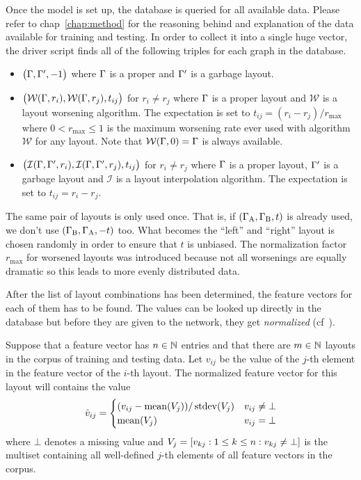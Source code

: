 \documentclass{graphstudy}
\begin{document}
Once the model is set up, the database is queried for all available data.  Please refer to \acl{chap}~\ref{chap:method}
for the reasoning behind and explanation of the data available for training and testing.  In order to collect it into a
single huge vector, the driver script finds all of the following triples for each graph in the database.
\begin{itemize}
\item\(\big(\Gamma,\Gamma',-1\big)\) where \(\Gamma\) is a proper and \(\Gamma'\) is a garbage layout.
\item\(\big(\mathcal{W}(\Gamma,r_i),\mathcal{W}(\Gamma,r_j),t_{ij}\big)\) for \(r_i\neq{}r_j\) where \(\Gamma\) is a
  proper layout and \(\mathcal{W}\) is a layout worsening algorithm.  The expectation is set to
  \(t_{ij}=(r_i-r_j)/r_\mathrm{max}\) where \(0<r_\mathrm{max}\leq1\) is the maximum worsening rate ever used with
  algorithm \(\mathcal{W}\) for any layout.  Note that \(\mathcal{W}(\Gamma,0)=\Gamma\) is always available.
\item\(\big(\mathcal{I}(\Gamma,\Gamma',r_i),\mathcal{I}(\Gamma,\Gamma',r_j),t_{ij}\big)\) for \(r_i\neq{}r_j\) where
  \(\Gamma\) is a proper layout, \(\Gamma'\) is a garbage layout and \(\mathcal{I}\) is a layout interpolation
  algorithm.  The expectation is set to \(t_{ij}=r_i-r_j\).
\end{itemize}
The same pair of layouts is only used once.  That is, if \((\Gamma_\mathrm{A},\Gamma_\mathrm{B},t)\) is already used,
we don't use \((\Gamma_\mathrm{B},\Gamma_\mathrm{A},-t)\) too.  What becomes the \enquote{left} and \enquote{right}
layout is chosen randomly in order to ensure that \(t\) is unbiased.  The normalization factor \(r_\mathrm{max}\) for
worsened layouts was introduced because not all worsenings are equally dramatic so this leads to more evenly distributed
data.

After the list of layout combinations has been determined, the feature vectors for each of them has to be found.  The
values can be looked up directly in the database but before they are given to the network, they get \emph{normalized}
(\acs{cf}~\textcite{LeCun1998}).

Suppose that a feature vector has \(n\in\mathbb{N}\) entries and that there are \(m\in\mathbb{N}\) layouts in the corpus of
training and testing data.  Let \(v_{ij}\) be the value of the \(j\)-th element in the feature vector of the \(i\)-th
layout.  The normalized feature vector for this layout will contains the value
\begin{equation}
  \hat{v}_{ij} =
  \begin{cases}
    (v_{ij}-\operatorname{mean}(\relax{V}_j)) / \operatorname{stdev}(\relax{V}_j)  &v_{ij}\neq\bot\\
    \operatorname{mean}(\relax{V}_j)                               &v_{ij}=\bot
  \end{cases}
\end{equation}
where \(\bot\) denotes a missing value and
\(\relax{V}_j=\left[v_{kj}:{}1\leq{}k\leq{}n:{}v_{kj}\neq\bot\right]\) is the multiset containing all
well-defined \(j\)-th elements of all feature vectors in the corpus.
\end{document}
